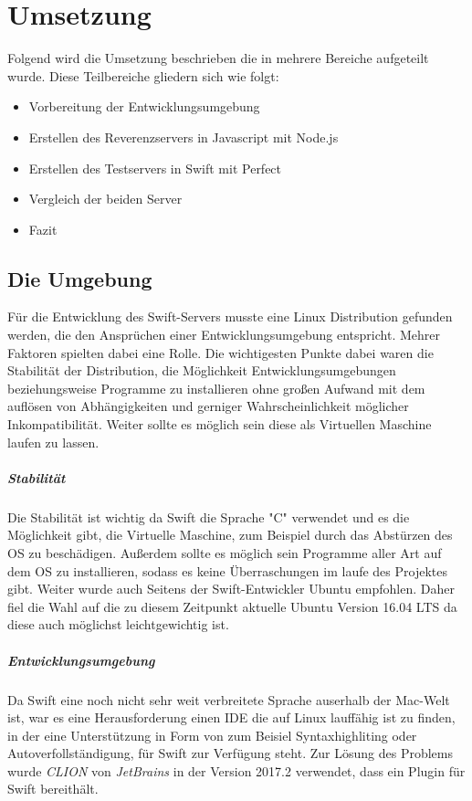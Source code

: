 \chapter{Umsetzung}\label{chap:Umsetzung}

\chapterstart

Folgend wird die Umsetzung beschrieben die in mehrere Bereiche aufgeteilt wurde. Diese Teilbereiche gliedern sich wie folgt:
\begin{itemize}
	\item Vorbereitung der Entwicklungsumgebung
	\item Erstellen des Reverenzservers in Javascript mit Node.js
	\item Erstellen des Testservers in Swift mit Perfect
	\item Vergleich der beiden Server
	\item Fazit
\end{itemize}

\section{Die Umgebung}
\label{sec:dieumgebung}

Für die Entwicklung des Swift-Servers musste eine Linux Distribution gefunden werden, die den Ansprüchen einer Entwicklungsumgebung entspricht. Mehrer Faktoren spielten dabei eine Rolle. Die wichtigesten Punkte dabei waren die Stabilität der Distribution, die Möglichkeit Entwicklungsumgebungen beziehungsweise Programme zu installieren ohne großen Aufwand mit dem auflösen von Abhängigkeiten und gerniger Wahrscheinlichkeit möglicher Inkompatibilität. Weiter sollte es möglich sein diese als Virtuellen Maschine laufen zu lassen. 

\paragraph{Stabilität}
Die Stabilität ist wichtig da Swift die Sprache "C" verwendet und es die Möglichkeit gibt, die Virtuelle Maschine, zum Beispiel durch das Abstürzen des OS zu beschädigen. Außerdem sollte es möglich sein Programme aller Art auf dem OS zu installieren, sodass es keine Überraschungen im laufe des Projektes gibt. Weiter wurde auch Seitens der Swift-Entwickler Ubuntu empfohlen. Daher fiel die Wahl auf die zu diesem Zeitpunkt aktuelle Ubuntu Version 16.04 LTS da diese auch möglichst leichtgewichtig ist. 

\paragraph{Entwicklungsumgebung}
Da Swift eine noch nicht sehr weit verbreitete Sprache auserhalb der Mac-Welt ist, war es eine Herausforderung einen IDE die auf Linux lauffähig ist zu finden, in der eine Unterstützung in Form von zum Beisiel Syntaxhighliting oder Autoverfollständigung, für Swift zur Verfügung steht. Zur Lösung des Problems wurde \textit{CLION} von \textit{JetBrains} \parencite{jetbrain} in der Version 2017.2 verwendet, dass ein Plugin für Swift bereithält.

